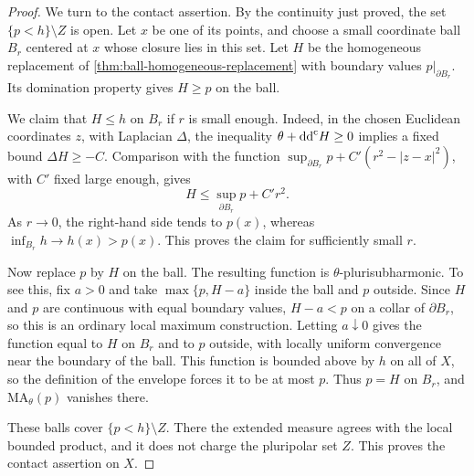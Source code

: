 \begin{proof}
We turn to the contact assertion. By the continuity just proved, the set $\{p<h\}\setminus Z$ is open. Let $x$ be one of its points, and choose a small coordinate ball $B_r$ centered at $x$ whose closure lies in this set. Let $H$ be the homogeneous replacement of \cref{thm:ball-homogeneous-replacement} with boundary values $p|_{\partial B_r}$. Its domination property gives $H\geq p$ on the ball.

We claim that $H\leq h$ on $B_r$ if $r$ is small enough. Indeed, in the chosen Euclidean coordinates $z$, with Laplacian $\Delta$, the inequality $\theta+\mathrm{dd}^{\mathrm{c}} H\geq0$ implies a fixed bound $\Delta H\geq-C$. Comparison with the function $\sup_{\partial B_r}p+C'(r^2-|z-x|^2)$, with $C'$ fixed large enough, gives
\[
 H\leq\sup_{\partial B_r}p+C'r^2.
\]
As $r\to0$, the right-hand side tends to $p(x)$, whereas $\inf_{B_r}h\to h(x)>p(x)$. This proves the claim for sufficiently small $r$.

Now replace $p$ by $H$ on the ball. The resulting function is $\theta$-plurisubharmonic. To see this, fix $a>0$ and take $\max\{p,H-a\}$ inside the ball and $p$ outside. Since $H$ and $p$ are continuous with equal boundary values, $H-a<p$ on a collar of $\partial B_r$, so this is an ordinary local maximum construction. Letting $a\downarrow0$ gives the function equal to $H$ on $B_r$ and to $p$ outside, with locally uniform convergence near the boundary of the ball. This function is bounded above by $h$ on all of $X$, so the definition of the envelope forces it to be at most $p$. Thus $p=H$ on $B_r$, and $\mathrm{MA}_\theta(p)$ vanishes there.

These balls cover $\{p<h\}\setminus Z$. There the extended measure agrees with the local bounded product, and it does not charge the pluripolar set $Z$. This proves the contact assertion on $X$.
\end{proof}

